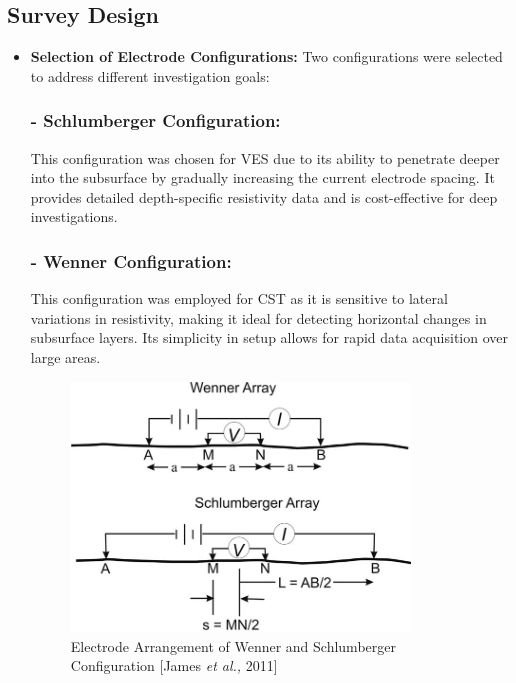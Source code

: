 \documentclass[12pt,a4paper]{report}
\begin{document}
\subsection{Survey Design}
\begin{itemize}
    \item \textbf{Selection of Electrode Configurations:}  
    Two configurations were selected to address different investigation goals:
    \subsubsection{- Schlumberger Configuration:} This configuration was chosen for VES due to its ability to penetrate deeper into the subsurface by gradually increasing the current electrode spacing. It provides detailed depth-specific resistivity data and is cost-effective for deep investigations.
    \subsubsection{- Wenner Configuration:} This configuration was employed for CST as it is sensitive to lateral variations in resistivity, making it ideal for detecting horizontal changes in subsurface layers. Its simplicity in setup allows for rapid data acquisition over large areas.
    \\[1cm]
    \begin{figure}[h]
        \centering
        \includegraphics[width=0.85\textwidth]{wenner_schlum.jpg}
        \caption{Electrode Arrangement of Wenner and Schlumberger Configuration [James \textit{et al.,} 2011]}
    \end{figure}


\end{itemize}
\end{document}
